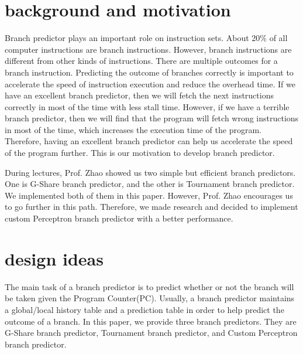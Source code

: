 \documentclass[conference]{IEEEtran}
\begin{document}
\section{background and motivation}
Branch predictor plays an important role on instruction sets. About 20\% of all computer instructions are branch instructions. However, branch instructions are
different from other kinds of instructions. There are multiple outcomes for a branch instruction. Predicting the outcome of branches correctly is important to accelerate the speed of instruction execution and reduce the overhead time. 
If we have an excellent branch predictor, then we will fetch the next instructions correctly in most of the time with less stall time. However, if we have a terrible branch predictor, then
we will find that the program will fetch wrong instructions in most of the time, which increases the execution time of the program. Therefore, having an excellent branch predictor can help us
accelerate the speed of the program further. This is our motivation to develop branch predictor. 

During lectures, Prof. Zhao showed us two simple but efficient branch predictors. One is G-Share branch predictor, and 
the other is Tournament branch predictor. We implemented both of them in this paper. However, Prof. Zhao encourages us to go further in this path. Therefore, we made research and decided to implement custom 
Perceptron branch predictor with a better performance. 

\section{design ideas}
The main task of a branch predictor is to predict whether or not the branch will be taken given the Program Counter(PC). Usually, a branch predictor maintains a global/local history table and a prediction table
in order to help predict the outcome of a branch. In this paper, we provide three branch predictors. They are G-Share branch predictor, Tournament branch predictor, and Custom Perceptron branch predictor. 
\end{document}
